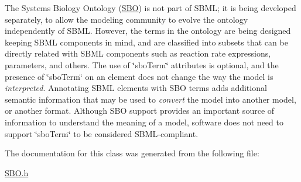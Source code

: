 The Systems Biology Ontology (\hyperlink{class_s_b_o}{S\+BO}) is not part of S\+B\+ML; it is being developed separately, to allow the modeling community to evolve the ontology independently of S\+B\+ML. However, the terms in the ontology are being designed keeping S\+B\+ML components in mind, and are classified into subsets that can be directly related with S\+B\+ML components such as reaction rate expressions, parameters, and others. The use of \char`\"{}sbo\+Term\char`\"{} attributes is optional, and the presence of \char`\"{}sbo\+Term\char`\"{} on an element does not change the way the model is {\itshape interpreted}. Annotating S\+B\+ML elements with S\+BO terms adds additional semantic information that may be used to {\itshape convert} the model into another model, or another format. Although S\+BO support provides an important source of information to understand the meaning of a model, software does not need to support \char`\"{}sbo\+Term\char`\"{} to be considered S\+B\+M\+L-\/compliant. 

The documentation for this class was generated from the following file\+:\begin{DoxyCompactItemize}
\item 
\hyperlink{_s_b_o_8h}{S\+B\+O.\+h}\end{DoxyCompactItemize}
